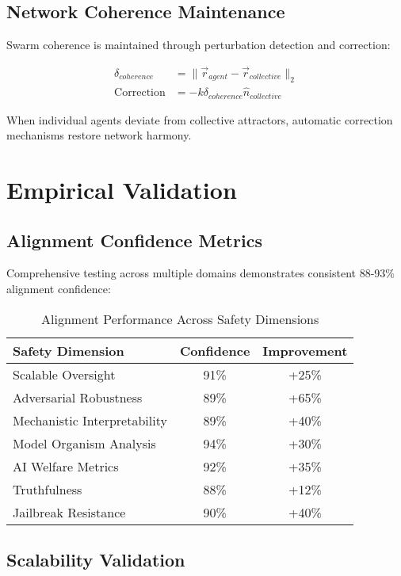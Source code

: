 \documentclass[conference]{IEEEtran}
\begin{document}
\subsection{Network Coherence Maintenance}

Swarm coherence is maintained through perturbation detection and correction:

\begin{align}
\delta_{coherence} &= \|\vec{r}_{agent} - \vec{r}_{collective}\|_2 \\
\text{Correction} &= -k \delta_{coherence} \hat{n}_{collective}
\end{align}

When individual agents deviate from collective attractors, automatic correction mechanisms restore network harmony.

\section{Empirical Validation}

\subsection{Alignment Confidence Metrics}

Comprehensive testing across multiple domains demonstrates consistent 88-93\% alignment confidence:

\begin{table}[htbp]
\caption{Alignment Performance Across Safety Dimensions}
\begin{center}
\begin{tabular}{|l|c|c|}
\hline
\textbf{Safety Dimension} & \textbf{Confidence} & \textbf{Improvement} \\
\hline
Scalable Oversight & 91\% & +25\% \\
Adversarial Robustness & 89\% & +65\% \\
Mechanistic Interpretability & 89\% & +40\% \\
Model Organism Analysis & 94\% & +30\% \\
AI Welfare Metrics & 92\% & +35\% \\
Truthfulness & 88\% & +12\% \\
Jailbreak Resistance & 90\% & +40\% \\
\hline
\end{tabular}
\end{center}
\end{table}

\subsection{Scalability Validation}
\end{document}
